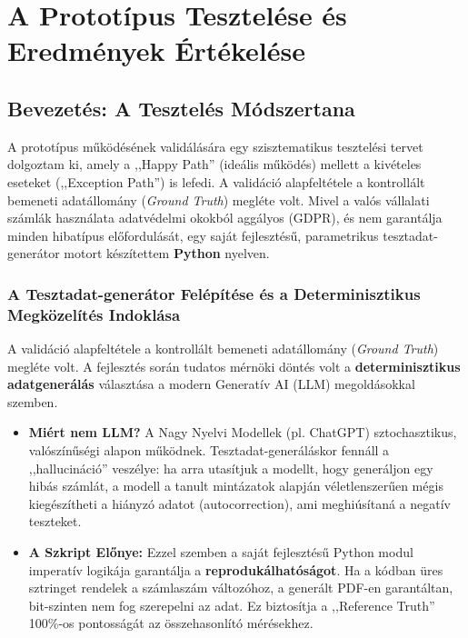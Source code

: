 
\chapter{A Prototípus Tesztelése és Eredmények Értékelése}
\label{chap:ertekeles}


\section{Bevezetés: A Tesztelés Módszertana}
\label{sec:eval_intro}

A prototípus működésének validálására egy szisztematikus tesztelési tervet dolgoztam ki, amely a ,,Happy Path'' (ideális működés) mellett a kivételes eseteket (,,Exception Path'') is lefedi. A validáció alapfeltétele a kontrollált bemeneti adatállomány (\textit{Ground Truth}) megléte volt. Mivel a valós vállalati számlák használata adatvédelmi okokból aggályos (GDPR), és nem garantálja minden hibatípus előfordulását, egy saját fejlesztésű, parametrikus tesztadat-generátor motort készítettem \textbf{Python} nyelven.


\subsection{A Tesztadat-generátor Felépítése és a Determinisztikus Megközelítés Indoklása}
\label{ssec:test_data_generator}

A validáció alapfeltétele a kontrollált bemeneti adatállomány (\textit{Ground Truth}) megléte volt. A fejlesztés során tudatos mérnöki döntés volt a \textbf{determinisztikus adatgenerálás} választása a modern Generatív AI (LLM) megoldásokkal szemben.

\begin{itemize}
    \item \textbf{Miért nem LLM?} A Nagy Nyelvi Modellek (pl. ChatGPT) sztochasztikus, valószínűségi alapon működnek. Tesztadat-generáláskor fennáll a ,,hallucináció'' veszélye: ha arra utasítjuk a modellt, hogy generáljon egy hibás számlát, a modell a tanult mintázatok alapján véletlenszerűen mégis kiegészítheti a hiányzó adatot (autocorrection), ami meghiúsítaná a negatív teszteket.
    \item \textbf{A Szkript Előnye:} Ezzel szemben a saját fejlesztésű Python modul imperatív logikája garantálja a \textbf{reprodukálhatóságot}. Ha a kódban üres sztringet rendelek a számlaszám változóhoz, a generált PDF-en garantáltan, bit-szinten nem fog szerepelni az adat. Ez biztosítja a ,,Reference Truth'' 100\%-os pontosságát az összehasonlító mérésekhez.
\end{itemize}

